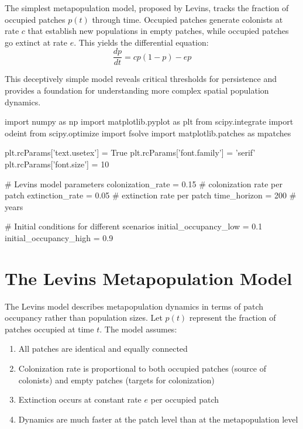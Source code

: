 \documentclass[11pt,a4paper]{article}
\begin{document}
The simplest metapopulation model, proposed by Levins, tracks the fraction of occupied patches $p(t)$ through time. Occupied patches generate colonists at rate $c$ that establish new populations in empty patches, while occupied patches go extinct at rate $e$. This yields the differential equation:
\begin{equation}
\frac{dp}{dt} = cp(1-p) - ep
\end{equation}

This deceptively simple model reveals critical thresholds for persistence and provides a foundation for understanding more complex spatial population dynamics.

\begin{pycode}
import numpy as np
import matplotlib.pyplot as plt
from scipy.integrate import odeint
from scipy.optimize import fsolve
import matplotlib.patches as mpatches

plt.rcParams['text.usetex'] = True
plt.rcParams['font.family'] = 'serif'
plt.rcParams['font.size'] = 10

# Levins model parameters
colonization_rate = 0.15  # colonization rate per patch
extinction_rate = 0.05    # extinction rate per patch
time_horizon = 200        # years

# Initial conditions for different scenarios
initial_occupancy_low = 0.1
initial_occupancy_high = 0.9
\end{pycode}

\section{The Levins Metapopulation Model}

The Levins model describes metapopulation dynamics in terms of patch occupancy rather than population sizes. Let $p(t)$ represent the fraction of patches occupied at time $t$. The model assumes:

\begin{enumerate}
\item All patches are identical and equally connected
\item Colonization rate is proportional to both occupied patches (source of colonists) and empty patches (targets for colonization)
\item Extinction occurs at constant rate $e$ per occupied patch
\item Dynamics are much faster at the patch level than at the metapopulation level
\end{enumerate}
\end{document}
